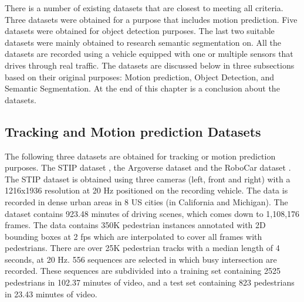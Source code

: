
There is a number of existing datasets that are closest to meeting all criteria. Three datasets were obtained for a purpose that includes motion prediction. Five datasets were obtained for object detection purposes. The last two suitable datasets were mainly obtained to research semantic segmentation on. All the datasets are recorded using a vehicle equipped with one or multiple sensors that drives through real traffic. The datasets are discussed below in three subsections based on their original purposes: Motion prediction, Object Detection, and Semantic Segmentation. At the end of this chapter is a conclusion about the datasets.


\subsection{Tracking and Motion prediction Datasets}
The following three datasets are obtained for tracking or motion prediction purposes. The \gls{STIP} dataset \cite{liu2020spatiotemporal}, the Argoverse dataset \cite{chang2019argoverse} and the RoboCar dataset \cite{robotcardatasetijrr}. \\

The \gls{STIP} dataset \cite{liu2020spatiotemporal} is obtained using three cameras (left, front and right) with a 1216x1936 resolution at 20 Hz positioned on the recording vehicle. The data is recorded in dense urban areas in 8 US cities (in California and Michigan). The dataset contains 923.48 minutes of driving scenes, which comes down to 1,108,176 frames. The data contains 350K pedestrian instances annotated with 2D bounding boxes at 2 fps which are interpolated to cover all frames with pedestrians. There are over 25K pedestrian tracks with a median length of 4 seconds, at 20 Hz. 556 sequences are selected in which busy intersection are recorded. These sequences are subdivided into a training set containing 2525 pedestrians in 102.37 minutes of video, and a test set containing 823 pedestrians in 23.43 minutes of video. \\

